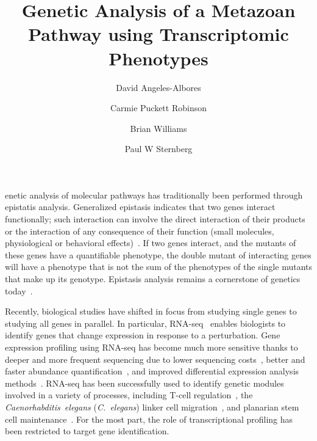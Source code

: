 \documentclass[9pt,twocolumn,twoside]{pnas-new}
\title{Genetic Analysis of a Metazoan Pathway using Transcriptomic Phenotypes}
\author[a,b,*]{David Angeles-Albores}
\author[a,b,*]{Carmie Puckett Robinson}
\author[a]{Brian Williams}
\author[a,b]{Paul W Sternberg}
\affil[a]{Division of Biology and Biological Engineering, Caltech, Pasadena, USA, 91125}
\affil[b]{Howard Hughes Medical Institute}
\affil[*]{These authors contributed equally to this manuscript}
\newcommand{\cel}{\emph{C.~elegans}}
\begin{document}
\verticaladjustment{-2pt}

\maketitle
\thispagestyle{firststyle}

enetic analysis of molecular pathways has traditionally been performed
through epistatis analysis. Generalized epistasis indicates that two genes interact
functionally; such interaction can involve the direct interaction of their
products or the interaction of any consequence of their function (small molecules,
physiological or behavioral effects)~\cite{Huang2006}. If two
genes interact, and the mutants of these genes have a quantifiable phenotype,
the double mutant of interacting genes will have a phenotype that is not the sum
of the phenotypes of the single mutants that make up its genotype. Epistasis
analysis remains a cornerstone of genetics today~\cite{Phillips2008}.

Recently, biological studies have shifted in focus from studying single
genes to studying all genes in parallel. In particular,
RNA-seq~\cite{Mortazavi2008} enables biologists to
identify genes that change expression in response to a perturbation. Gene expression
profiling using RNA-seq has become much more sensitive thanks to deeper and more
frequent sequencing due to lower sequencing costs~\cite{Metzker2010},
better and faster abundance quantification~\cite{Patro2014,Bray2016,Patro2015},
and improved differential expression analysis
methods~\cite{Pimentel2016,Trapnell2013}. RNA-seq has been
successfully used to identify genetic modules involved in a variety of processes,
including T-cell regulation~\cite{Singer2016,Shalek2013}, the
\emph{Caenorhabditis~elegans} (\cel{}) linker
cell migration~\cite{Schwarz2012}, and planarian stem cell
maintenance~\cite{VanWolfswinkel2014,Scimone2014}. For the most part, the role of
transcriptional profiling has been restricted to target gene identification.
\end{document}

